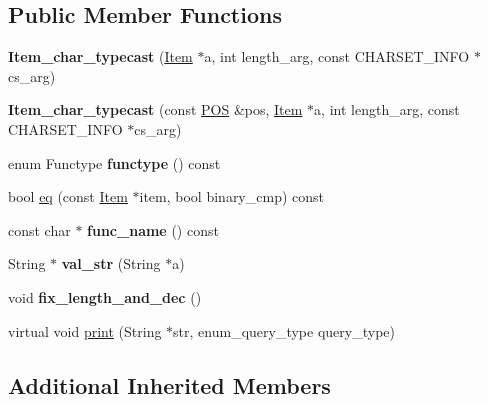 \subsection*{Public Member Functions}
\begin{DoxyCompactItemize}
\item 
\mbox{\label{classItem__char__typecast_a4a6ee4a29216d206dac8518628234730}} 
{\bfseries Item\+\_\+char\+\_\+typecast} (\mbox{\hyperlink{classItem}{Item}} $\ast$a, int length\+\_\+arg, const C\+H\+A\+R\+S\+E\+T\+\_\+\+I\+N\+FO $\ast$cs\+\_\+arg)
\item 
\mbox{\label{classItem__char__typecast_a8089fff3d6a57f0ec0fa260ebfbe9cfa}} 
{\bfseries Item\+\_\+char\+\_\+typecast} (const \mbox{\hyperlink{structYYLTYPE}{P\+OS}} \&pos, \mbox{\hyperlink{classItem}{Item}} $\ast$a, int length\+\_\+arg, const C\+H\+A\+R\+S\+E\+T\+\_\+\+I\+N\+FO $\ast$cs\+\_\+arg)
\item 
\mbox{\label{classItem__char__typecast_a0b311a0e6e5229c2c1274fc444aad9ae}} 
enum Functype {\bfseries functype} () const
\item 
bool \mbox{\hyperlink{classItem__char__typecast_a8ed432731786b97255a7a47901c79768}{eq}} (const \mbox{\hyperlink{classItem}{Item}} $\ast$item, bool binary\+\_\+cmp) const
\item 
\mbox{\label{classItem__char__typecast_aa8018b2a5607b505cf0e2b4c176c995b}} 
const char $\ast$ {\bfseries func\+\_\+name} () const
\item 
\mbox{\label{classItem__char__typecast_a023ba2bca8106d164cd42c631aa22c77}} 
String $\ast$ {\bfseries val\+\_\+str} (String $\ast$a)
\item 
\mbox{\label{classItem__char__typecast_ad3d045cb8b4ba0461befb32cc393c2c4}} 
void {\bfseries fix\+\_\+length\+\_\+and\+\_\+dec} ()
\item 
virtual void \mbox{\hyperlink{classItem__char__typecast_adf128fa02d763bb58d3501358a1d1e1a}{print}} (String $\ast$str, enum\+\_\+query\+\_\+type query\+\_\+type)
\end{DoxyCompactItemize}
\subsection*{Additional Inherited Members}


